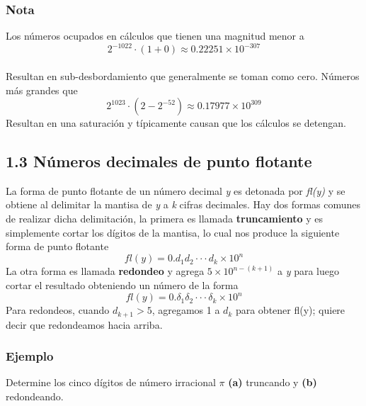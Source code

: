 \begin{tcolorbox}[colback=gray!5!]
\subsubsection*{Nota}
Los números ocupados en cálculos que tienen una magnitud menor a \\
\begin{equation*} 
2^{-1022}\cdot(1+0) \approx 0.22251\times 10^{-307}
\end{equation*}\\
Resultan en sub-desbordamiento que generalmente se toman como cero. Números más grandes que
\begin{equation*} 
2^{1023}\cdot(2-2^{-52}) \approx 0.17977\times 10^{309}
\end{equation*}
Resultan en una saturación y típicamente causan que los cálculos se detengan.
\end{tcolorbox}

\subsection*{1.3 Números decimales de punto flotante}
La forma de punto flotante de un número decimal \textit{y} es detonada por \textit{fl(y)} y se obtiene al delimitar la mantisa de \textit{y} a \textit{k} cifras decimales. Hay dos formas comunes de realizar dicha delimitación, la primera es llamada \textbf{truncamiento} y es simplemente cortar los dígitos de la mantisa, lo cual nos produce la siguiente forma de punto flotante
\begin{equation*}
    fl(y)=0.d_1d_2\cdot\cdot\cdot d_k\times10^{n}
\end{equation*}
La otra forma es llamada \textbf{redondeo} y agrega $5\times10^{n-(k+1)}$ a \textit{y} para luego cortar el resultado obteniendo un número de la forma
\begin{equation*}
    fl(y)=0.\delta_1\delta_2\cdot\cdot\cdot \delta_k\times10^{n}
\end{equation*}
Para redondeos, cuando $d_{k+1}>5$, agregamos 1 a $d_k$ para obtener fl(y); quiere decir que redondeamos hacia arriba.

\subsubsection*{Ejemplo}
Determine los cinco dígitos de número irracional $\pi$ \textbf{(a)} truncando y \textbf{(b)} redondeando.

